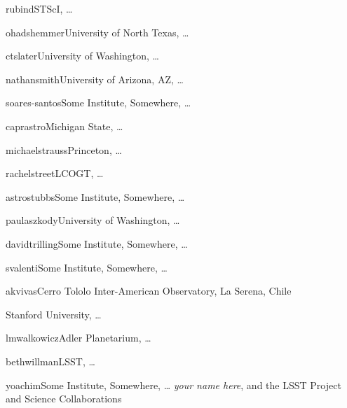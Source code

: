 \author{David Rubin}{rubind}{STScI, \ldots}
\author{Ohad Shemmer}{ohadshemmer}{University of North Texas, \ldots}
\author{Colin Slater}{ctslater}{University of Washington, \ldots}
\author{Nathan Smith}{nathansmith}{University of Arizona, AZ, \ldots}
\author{Marcelles Soares-Santos}{soares-santos}{Some Institute, Somewhere, \ldots}
\author{Jay Strader}{caprastro}{Michigan State, \ldots}
\author{Michael Strauss}{michaelstrauss}{Princeton, \ldots}
\author{Rachel Street}{rachelstreet}{LCOGT, \ldots}
\author{Christopher Stubbs}{astrostubbs}{Some Institute, Somewhere, \ldots}
\author{Paula Szkody}{paulaszkody}{University of Washington, \ldots}
\author{David Trilling}{davidtrilling}{Some Institute, Somewhere, \ldots}
\author{Stefano Valenti}{svalenti}{Some Institute, Somewhere, \ldots}
\author{Kathy Vivas}{akvivas}{Cerro Tololo Inter-American Observatory, La Serena, Chile}
\author{Robert Wagoner}{}{Stanford University, \ldots}
\author{Lucianne Walkowicz}{lmwalkowicz}{Adler Planetarium, \ldots}
\author{Beth Willman}{bethwillman}{LSST, \ldots}
\author{Peter Yoachim}{yoachim}{Some Institute, Somewhere, \ldots}
{\it your name here},
{and the LSST Project and Science Collaborations}
